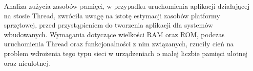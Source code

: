 Analiza zużycia zasobów pamięci, w przypadku uruchomienia aplikacji działającej na stosie Thread, zwróciła uwagę na istotę estymacji zasobów platformy sprzętowej, przed przystąpieniem do tworzenia aplikacji dla systemów wbudowanych. Wymagania dotyczące wielkości RAM oraz ROM, podczas uruchomienia Thread oraz funkcjonalności z nim związanych, rzuciły cień na problem wdrożenia tego typu sieci w urządzeniach o małej liczbie pamięci ulotnej oraz nieulotnej.